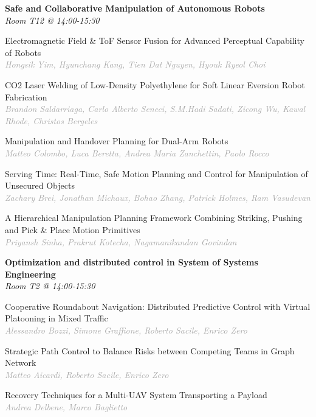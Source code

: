\begin{multicols*}{2}
\normalsize \textbf{Safe and Collaborative Manipulation of Autonomous Robots}\\
\small \textit{Room T12 @ 14:00-15:30}

\small Electromagnetic Field \& ToF Sensor Fusion for Advanced Perceptual Capability of Robots\\ 
\footnotesize \textcolor{darkgray}{\textit{Hongsik Yim, Hyunchang  Kang, Tien Dat  Nguyen, Hyouk Ryeol  Choi}}

\small CO2 Laser Welding of Low-Density Polyethylene for Soft Linear Eversion Robot Fabrication\\ 
\footnotesize \textcolor{darkgray}{\textit{Brandon Saldarriaga, Carlo Alberto  Seneci, S.M.Hadi  Sadati, Zicong  Wu, Kawal  Rhode, Christos  Bergeles}}

\small Manipulation and Handover Planning for Dual-Arm Robots\\ 
\footnotesize \textcolor{darkgray}{\textit{Matteo Colombo, Luca  Beretta, Andrea Maria  Zanchettin, Paolo  Rocco}}

\small Serving Time: Real-Time, Safe Motion Planning and Control for Manipulation of Unsecured Objects\\ 
\footnotesize \textcolor{darkgray}{\textit{Zachary Brei, Jonathan  Michaux, Bohao  Zhang, Patrick  Holmes, Ram  Vasudevan}}

\small A Hierarchical Manipulation Planning Framework Combining Striking, Pushing and Pick \& Place Motion Primitives\\ 
\footnotesize \textcolor{darkgray}{\textit{Priyansh Sinha, Prakrut  Kotecha, Nagamanikandan  Govindan}}

\normalsize \textbf{Optimization and distributed control in System of Systems Engineering}\\
\small \textit{Room T2 @ 14:00-15:30}

\small Cooperative Roundabout Navigation: Distributed Predictive Control with Virtual Platooning in Mixed Traffic\\ 
\footnotesize \textcolor{darkgray}{\textit{Alessandro Bozzi, Simone  Graffione, Roberto  Sacile, Enrico  Zero}}

\small Strategic Path Control to Balance Risks between Competing Teams in Graph Network\\ 
\footnotesize \textcolor{darkgray}{\textit{Matteo Aicardi, Roberto  Sacile, Enrico  Zero}}

\small Recovery Techniques for a Multi-UAV System Transporting a Payload\\ 
\footnotesize \textcolor{darkgray}{\textit{Andrea Delbene, Marco  Baglietto}}


\end{multicols*}
